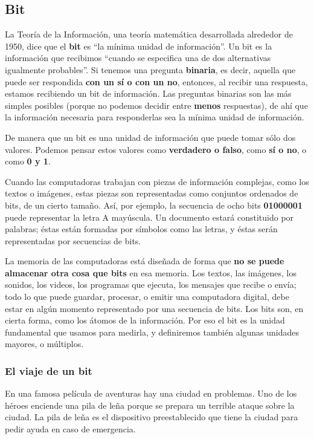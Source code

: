 \documentclass[spanish,a4paper,]{article}
\begin{document}
\hypertarget{bit}{%
\subsection{Bit}\label{bit}}

La Teoría de la Información, una teoría matemática desarrollada
alrededor de 1950, dice que el \textbf{bit} es ``la mínima unidad de
información''. Un bit es la información que recibimos ``cuando se
especifica una de dos alternativas igualmente probables''. Si tenemos
una pregunta \textbf{binaria}, es decir, aquella que puede ser
respondida \textbf{con un sí o con un no}, entonces, al recibir una
respuesta, estamos recibiendo un bit de información. Las preguntas
binarias son las más simples posibles (porque no podemos decidir entre
\textbf{menos} respuestas), de ahí que la información necesaria para
responderlas sea la mínima unidad de información.

De manera que un bit es una unidad de información que puede tomar sólo
dos valores. Podemos pensar estos valores como \textbf{verdadero o
falso}, como \textbf{sí o no}, o como \textbf{0 y 1}.

Cuando las computadoras trabajan con piezas de información complejas,
como los textos o imágenes, estas piezas son representadas como
conjuntos ordenados de bits, de un cierto tamaño. Así, por ejemplo, la
secuencia de ocho bits \textbf{01000001} puede representar la letra A
mayúscula. Un documento estará constituido por palabras; éstas están
formadas por símbolos como las letras, y éstas serán representadas por
secuencias de bits.

La memoria de las computadoras está diseñada de forma que \textbf{no se
puede almacenar otra cosa que bits} en esa memoria. Los textos, las
imágenes, los sonidos, los videos, los programas que ejecuta, los
mensajes que recibe o envía; todo lo que puede guardar, procesar, o
emitir una computadora digital, debe estar en algún momento representado
por una secuencia de bits. Los bits son, en cierta forma, como los
átomos de la información. Por eso el bit es la unidad fundamental que
usamos para medirla, y definiremos también algunas unidades mayores, o
múltiplos.

\hypertarget{el-viaje-de-un-bit}{%
\subsubsection{El viaje de un bit}\label{el-viaje-de-un-bit}}

En una famosa película de aventuras hay una ciudad en problemas. Uno de
los héroes enciende una pila de leña porque se prepara un terrible
ataque sobre la ciudad. La pila de leña es el dispositivo preestablecido
que tiene la ciudad para pedir ayuda en caso de emergencia.
\end{document}
